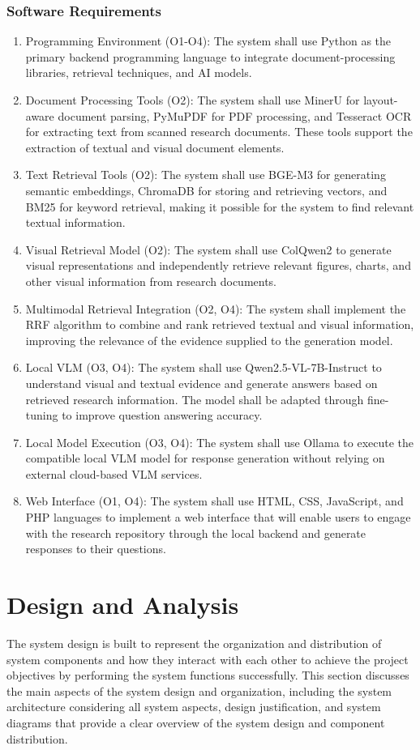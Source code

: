 \documentclass[11pt,a4paper]{report}
\begin{document}
\subsubsection{Software Requirements}
\begin{enumerate}
  \item Programming Environment (O1-O4): The system shall use Python as the primary backend programming language to integrate document-processing libraries, retrieval techniques, and AI models.
  \item Document Processing Tools (O2): The system shall use MinerU for layout-aware document parsing, PyMuPDF for \ac{PDF} processing, and Tesseract \ac{OCR} for extracting text from scanned research documents. These tools support the extraction of textual and visual document elements.
  \item Text Retrieval Tools (O2): The system shall use BGE-M3 for generating semantic embeddings, ChromaDB for storing and retrieving vectors, and \ac{BM25} for keyword retrieval, making it possible for the system to find relevant textual information.
  \item Visual Retrieval Model (O2): The system shall use ColQwen2 to generate visual representations and independently retrieve relevant figures, charts, and other visual information from research documents.
  \item Multimodal Retrieval Integration (O2, O4): The system shall implement the \ac{RRF} algorithm to combine and rank retrieved textual and visual information, improving the relevance of the evidence supplied to the generation model.
  \item Local \ac{VLM} (O3, O4): The system shall use Qwen2.5-VL-7B-Instruct to understand visual and textual evidence and generate answers based on retrieved research information. The model shall be adapted through fine-tuning to improve question answering accuracy.
  \item Local Model Execution (O3, O4): The system shall use Ollama to execute the compatible local \ac{VLM} model for response generation without relying on external cloud-based \ac{VLM} services.
  \item Web Interface (O1, O4): The system shall use HTML, CSS, JavaScript, and PHP languages to implement a web interface that will enable users to engage with the research repository through the local backend and generate responses to their questions.
\end{enumerate}
\cleardoublepage

\section{Design and Analysis}
The system design is built to represent the organization and distribution of system components and how they interact with each other to achieve the project objectives by performing the system functions successfully. This section discusses the main aspects of the system design and organization, including the system architecture considering all system aspects, design justification, and system diagrams that provide a clear overview of the system design and component distribution.
\end{document}
